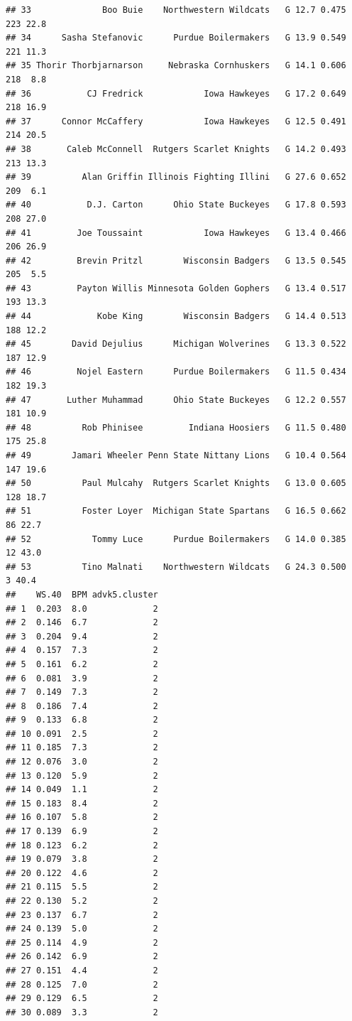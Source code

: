 \documentclass[
]{book}
\begin{document}
\begin{verbatim}
## 33              Boo Buie    Northwestern Wildcats   G 12.7 0.475   223 22.8
## 34      Sasha Stefanovic      Purdue Boilermakers   G 13.9 0.549   221 11.3
## 35 Thorir Thorbjarnarson     Nebraska Cornhuskers   G 14.1 0.606   218  8.8
## 36           CJ Fredrick            Iowa Hawkeyes   G 17.2 0.649   218 16.9
## 37      Connor McCaffery            Iowa Hawkeyes   G 12.5 0.491   214 20.5
## 38       Caleb McConnell  Rutgers Scarlet Knights   G 14.2 0.493   213 13.3
## 39          Alan Griffin Illinois Fighting Illini   G 27.6 0.652   209  6.1
## 40           D.J. Carton      Ohio State Buckeyes   G 17.8 0.593   208 27.0
## 41         Joe Toussaint            Iowa Hawkeyes   G 13.4 0.466   206 26.9
## 42         Brevin Pritzl        Wisconsin Badgers   G 13.5 0.545   205  5.5
## 43         Payton Willis Minnesota Golden Gophers   G 13.4 0.517   193 13.3
## 44             Kobe King        Wisconsin Badgers   G 14.4 0.513   188 12.2
## 45        David Dejulius      Michigan Wolverines   G 13.3 0.522   187 12.9
## 46         Nojel Eastern      Purdue Boilermakers   G 11.5 0.434   182 19.3
## 47       Luther Muhammad      Ohio State Buckeyes   G 12.2 0.557   181 10.9
## 48          Rob Phinisee         Indiana Hoosiers   G 11.5 0.480   175 25.8
## 49        Jamari Wheeler Penn State Nittany Lions   G 10.4 0.564   147 19.6
## 50          Paul Mulcahy  Rutgers Scarlet Knights   G 13.0 0.605   128 18.7
## 51          Foster Loyer  Michigan State Spartans   G 16.5 0.662    86 22.7
## 52            Tommy Luce      Purdue Boilermakers   G 14.0 0.385    12 43.0
## 53          Tino Malnati    Northwestern Wildcats   G 24.3 0.500     3 40.4
##    WS.40  BPM advk5.cluster
## 1  0.203  8.0             2
## 2  0.146  6.7             2
## 3  0.204  9.4             2
## 4  0.157  7.3             2
## 5  0.161  6.2             2
## 6  0.081  3.9             2
## 7  0.149  7.3             2
## 8  0.186  7.4             2
## 9  0.133  6.8             2
## 10 0.091  2.5             2
## 11 0.185  7.3             2
## 12 0.076  3.0             2
## 13 0.120  5.9             2
## 14 0.049  1.1             2
## 15 0.183  8.4             2
## 16 0.107  5.8             2
## 17 0.139  6.9             2
## 18 0.123  6.2             2
## 19 0.079  3.8             2
## 20 0.122  4.6             2
## 21 0.115  5.5             2
## 22 0.130  5.2             2
## 23 0.137  6.7             2
## 24 0.139  5.0             2
## 25 0.114  4.9             2
## 26 0.142  6.9             2
## 27 0.151  4.4             2
## 28 0.125  7.0             2
## 29 0.129  6.5             2
## 30 0.089  3.3             2

\end{verbatim}
\end{document}

